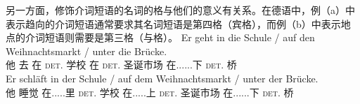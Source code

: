 \eal
{}
\zl
另一方面，修饰介词短语的名词的格与他们的意义有关系。在德语中，例（a）中表示趋向的介词短语通常要求其名词短语是第四格（宾格），而例（b）中表示地点的介词短语则需要是第三格（与格）。
\eal
\ex
\gll Er geht in die Schule / auf den Weihnachtsmarkt / unter die Brücke.\\
	 他 去 在 \textsc{det}.\acc{} 学校 {} 在 \textsc{det}.\acc{} 圣诞市场 {} 在......下 \textsc{det}.\acc{} 桥\\
\ex 
\gll Er schläft in der Schule / auf dem Weihnachtsmarkt / unter der Brücke.\\
	 他 睡觉 在.....里 \textsc{det}.\dat{} 学校 {} 在.....上 \textsc{det}.\dat{} 圣诞市场 {} 在......下 \textsc{det}.\dat{} 桥\\
\zl


